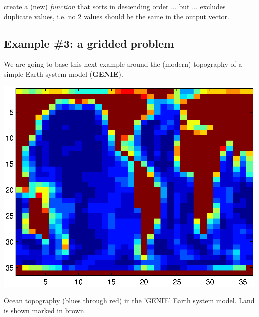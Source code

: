 \documentclass{tufte-book} %
\begin{document}
 create a (new) \textit{function} that sorts in descending order ... but ... \uline{excludes duplicate values}, i.e. no 2 values should be the same in the output vector.


\newpage

\subsection{Example \#3: a gridded problem}

We are going to base this next example around the (modern) topography of a simple Earth system model (\textbf{GENIE}).

\begin{marginfigure}[0.0in]
\includegraphics[width=\linewidth]{ch3-genietopo.eps}
\caption{Ocean topography (blues through red) in the 'GENIE' Earth system model. Land is shown marked in brown.}
\label{fig:ch3-genietopo}
\end{marginfigure}
\end{document}

